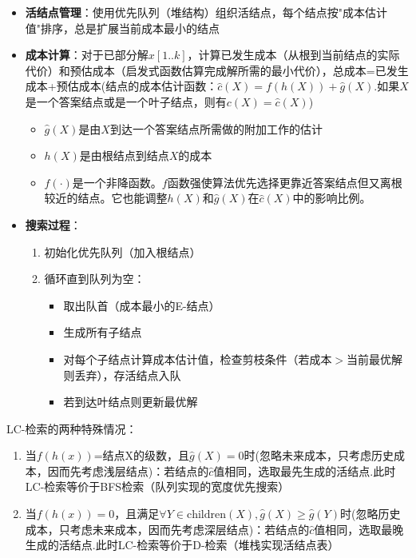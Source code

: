 \documentclass[./../main.tex]{subfiles}
\begin{document}
\begin{itemize}
    \item \textbf{活结点管理}：使用优先队列（堆结构）组织活结点，每个结点按"成本估计值"排序，总是扩展当前成本最小的结点
    
    \item \textbf{成本计算}：对于已部分解$x[1..k]$，计算已发生成本（从根到当前结点的实际代价）和预估成本（启发式函数估算完成解所需的最小代价），总成本=已发生成本+预估成本(结点的成本估计函数：$\hat{c}(X)=f(h(X))+\hat{g}(X)$.如果$X$是一个答案结点或是一个叶子结点，则有$c(X)=\hat{c}(X)$)

    \begin{itemize}
        \item $\hat{g}(X)$是由$X$到达一个答案结点所需做的附加工作的估计
        \item $h(X)$是由根结点到结点$X$的成本
        \item $f(\cdot)$是一个非降函数。$f$函数强使算法优先选择更靠近答案结点但又离根较近的结点。它也能调整$h(X)$和$\hat{g}(X)$在$\hat{c}(X)$中的影响比例。
    \end{itemize}
    \item \textbf{搜索过程}：
    \begin{enumerate}
        \item 初始化优先队列（加入根结点）
        \item 循环直到队列为空：
        \begin{itemize}
            \item 取出队首（成本最小的E-结点）
            \item 生成所有子结点
            \item 对每个子结点计算成本估计值，检查剪枝条件（若成本$>$当前最优解则丢弃），存活结点入队
            \item 若到达叶结点则更新最优解
        \end{itemize}
    \end{enumerate}
\end{itemize}

LC-检索的两种特殊情况：

\begin{enumerate}
    \item 当$f(h(x))$=结点X的级数，且$\hat{g}(X)=0$时(忽略未来成本，只考虑历史成本，因而先考虑浅层结点)：若结点的$\hat{c}$值相同，选取最先生成的活结点.此时LC-检索等价于BFS检索（队列实现的宽度优先搜索）
    \item 当$f(h(x))=0$，且满足$\forall Y \in \text{children}(X), \hat{g}(X) \geq \hat{g}(Y)$时(忽略历史成本，只考虑未来成本，因而先考虑深层结点)：若结点的$\hat{c}$值相同，选取最晚生成的活结点.此时LC-检索等价于D-检索（堆栈实现活结点表）
\end{enumerate}
\end{document}
